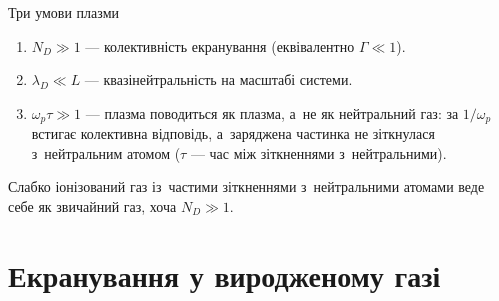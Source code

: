 \documentclass[]{beamer}
\begin{document}
\begin{frame}{Три умови плазми}
	\begin{enumerate}\justifying
		\item[1.] $N_D\gg1$ --- \alert{колективність} екранування (еквівалентно $\Gamma\ll1$).
		\vspace*{0.5em}
		\item[2.] $\lambda_D\ll L$ --- \alert{квазінейтральність} на масштабі системи.
		\vspace*{0.5em}
		\item[3.] $\omega_p\tau\gg1$ --- плазма поводиться як плазма, а~не як нейтральний газ: за $1/\omega_p$ встигає
		колективна відповідь, а~заряджена частинка не зіткнулася з~нейтральним атомом ($\tau$ --- час між зіткненнями
		з~нейтральними).
	\end{enumerate}
	\begin{alertblock}{}\justifying\small
		Слабко іонізований газ із~частими зіткненнями з~нейтральними атомами веде себе як звичайний газ, хоча $N_D\gg1$.
	\end{alertblock}
\end{frame}

\section{Екранування у виродженому газі}
\end{document}
